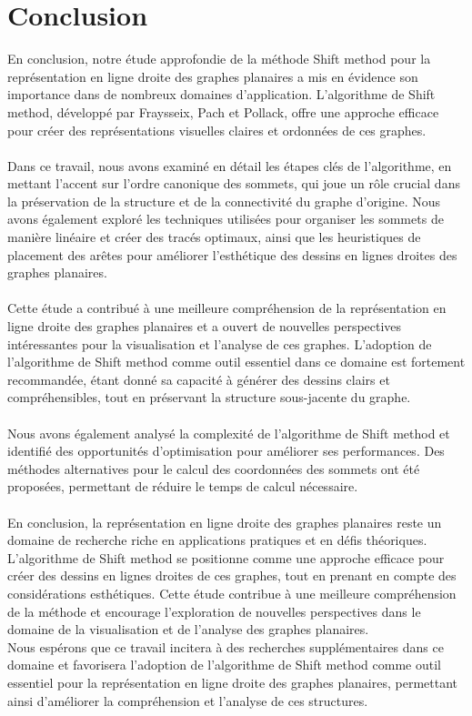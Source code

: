 \documentclass[hidelinks,letterpaper,12pt]{article}
\begin{document}
\newpage    
\section{Conclusion}
En conclusion, notre étude approfondie de la méthode Shift method pour la représentation en ligne droite des graphes planaires a mis en évidence son importance dans de nombreux domaines d'application. L'algorithme de Shift method, développé par Fraysseix, Pach et Pollack, offre une approche efficace pour créer des représentations visuelles claires et ordonnées de ces graphes.
\\ \\
Dans ce travail, nous avons examiné en détail les étapes clés de l'algorithme, en mettant l'accent sur l'ordre canonique des sommets, qui joue un rôle crucial dans la préservation de la structure et de la connectivité du graphe d'origine. Nous avons également exploré les techniques utilisées pour organiser les sommets de manière linéaire et créer des tracés optimaux, ainsi que les heuristiques de placement des arêtes pour améliorer l'esthétique des dessins en lignes droites des graphes planaires.
\\ \\
Cette étude a contribué à une meilleure compréhension de la représentation en ligne droite des graphes planaires et a ouvert de nouvelles perspectives intéressantes pour la visualisation et l'analyse de ces graphes. L'adoption de l'algorithme de Shift method comme outil essentiel dans ce domaine est fortement recommandée, étant donné sa capacité à générer des dessins clairs et compréhensibles, tout en préservant la structure sous-jacente du graphe.
\\ \\
Nous avons également analysé la complexité de l'algorithme de Shift method et identifié des opportunités d'optimisation pour améliorer ses performances. Des méthodes alternatives pour le calcul des coordonnées des sommets ont été proposées, permettant de réduire le temps de calcul nécessaire.
\\ \\
En conclusion, la représentation en ligne droite des graphes planaires reste un domaine de recherche riche en applications pratiques et en défis théoriques. L'algorithme de Shift method se positionne comme une approche efficace pour créer des dessins en lignes droites de ces graphes, tout en prenant en compte des considérations esthétiques. Cette étude contribue à une meilleure compréhension de la méthode et encourage l'exploration de nouvelles perspectives dans le domaine de la visualisation et de l'analyse des graphes planaires.
\\
Nous espérons que ce travail incitera à des recherches supplémentaires dans ce domaine et favorisera l'adoption de l'algorithme de Shift method comme outil essentiel pour la représentation en ligne droite des graphes planaires, permettant ainsi d'améliorer la compréhension et l'analyse de ces structures.
\end{document}
